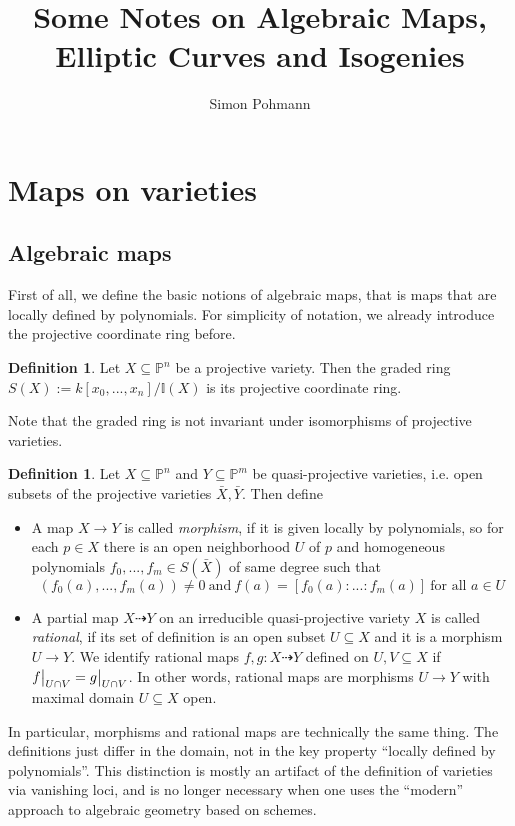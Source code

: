 \documentclass{scrartcl}
\title{Some Notes on Algebraic Maps, Elliptic Curves and Isogenies}
\author{Simon Pohmann}
\newcommand{\I}{\mathbb{I}}
\newcommand{\Proj}{\mathbb{P}}
\newcommand\restr[2]{{
    \left.\kern-\nulldelimiterspace
    #1
    \vphantom{\big|}
    \right|_{#2}
}}
\theoremstyle{definition}
\newtheorem{definition}[prop]{Definition}
\begin{document}
\maketitle

\tableofcontents

\section{Maps on varieties}

\subsection{Algebraic maps}
First of all, we define the basic notions of algebraic maps, that is maps that are locally defined by polynomials.
For simplicity of notation, we already introduce the projective coordinate ring before.
\begin{definition}
    Let $X \subseteq \Proj^n$ be a projective variety. 
    Then the graded ring $S(X) := k[x_0, ..., x_n] / \I(X)$ is its projective coordinate ring.
\end{definition}
Note that the graded ring is not invariant under isomorphisms of projective varieties.
\begin{definition}
    Let $X \subseteq \Proj^n$ and $Y \subseteq \Proj^m$ be quasi-projective varieties, i.e. open subsets of the projective varieties $\bar{X}, \bar{Y}$.
    Then define
    \begin{itemize}
        \item A map $X \to Y$ is called \emph{morphism}, if it is given locally by polynomials, so for each $p \in X$ there is an open neighborhood $U$ of $p$ and homogeneous polynomials $f_0, ..., f_m \in S(\bar{X})$ of same degree such that
        \begin{equation*}
            (f_0(a), ..., f_m(a)) \neq 0 \ \text{and} \ f(a) = [f_0(a) : ... : f_m(a)] \ \text{for all $a \in U$}
        \end{equation*}
        \item A partial map $X \dashrightarrow Y$ on an irreducible quasi-projective variety $X$ is called \emph{rational}, if its set of definition is an open subset $U \subseteq X$ and it is a morphism $U \to Y$.
        We identify rational maps $f, g: X \dashrightarrow Y$ defined on $U, V \subseteq X$ if $\restr{f}{U \cap V} = \restr{g}{U \cap V}$.
        In other words, rational maps are morphisms $U \to Y$ with maximal domain $U \subseteq X$ open.
    \end{itemize}
\end{definition}
In particular, morphisms and rational maps are technically the same thing.
The definitions just differ in the domain, not in the key property ``locally defined by polynomials''.
This distinction is mostly an artifact of the definition of varieties via vanishing loci, and is no longer necessary when one uses the ``modern'' approach to algebraic geometry based on schemes.
\end{document}
